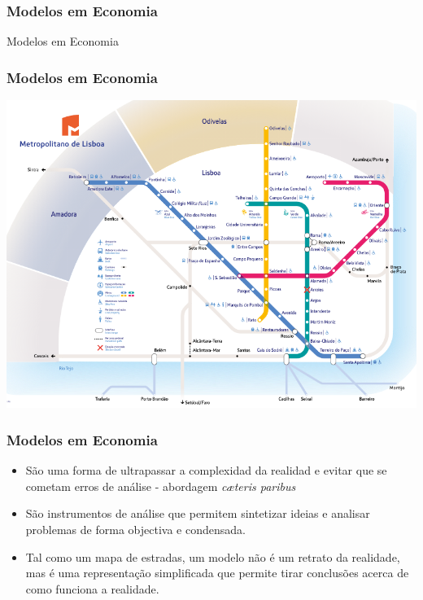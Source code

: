 \begin{frame}
	\frametitle{Modelos em Economia}

	\begin{center}
		{\huge Modelos em Economia}
	\end{center}

\end{frame}

\begin{frame}
	\frametitle{Modelos em Economia}
	\begin{center}
		\includegraphics[scale=0.3]{metro.png}
	\end{center}

\end{frame}

\begin{frame}
	\frametitle{Modelos em Economia}
	\begin{itemize}
		\item S\~ao uma forma de ultrapassar a complexidad da realidad e evitar que se cometam erros de an\'alise - abordagem \emph{c\ae teris paribus} \pause
		\item S\~ao instrumentos de an\'alise que permitem sintetizar ideias e analisar problemas de forma objectiva e condensada.\pause
		\item Tal como um mapa de estradas, um modelo n\~ao \'e um retrato da realidade, mas \'e uma representa\c c\~ao simplificada que permite tirar conclus\~oes acerca de como funciona a realidade.
	\end{itemize}

\end{frame}

